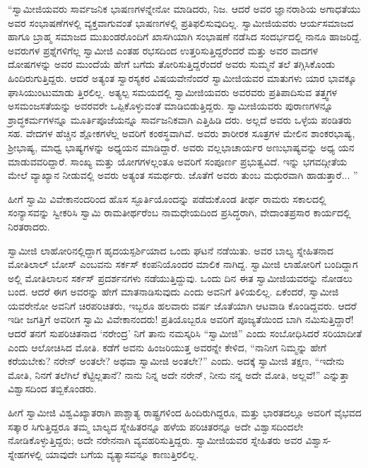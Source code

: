 “ಸ್ವಾಮೀಜಿಯವರು ಸಾರ್ವಜನಿಕ ಭಾಷಣಗಳನ್ನೇನೋ ಮಾಡಿದರು, ನಿಜ. ಆದರೆ ಅವರ ಜ್ಞಾನರಾಶಿಯ ಅಗಾಧತೆಯು ಅವರ ಸಂಭಾಷಣೆಗಳಲ್ಲಿ ವ್ಯಕ್ತವಾಗುವಂತೆ ಭಾಷಣಗಳಲ್ಲಿ ಪ್ರತಿಫಲಿಸುವುದಿಲ್ಲ. ಸ್ವಾಮೀಜಿಯವರು ಆರ್ಯಸಮಾಜದ ಹಾಗೂ ಬ್ರಾಹ್ಮ ಸಮಾಜದ ಮುಖಂಡರೊಂದಿಗೆ ಖಾಸಗಿಯಾಗಿ ಸಂಭಾಷಣೆ ನಡೆಸಿದ ಸಂದರ್ಭದಲ್ಲಿ ನಾನೂ ಹಾಜರಿದ್ದೆ. ಅವರುಗಳ ಪ್ರಶ್ನೆಗಳಿಗೆಲ್ಲ ಸ್ವಾಮೀಜಿ ಎಂತಹ ರಭಸದಿಂದ ಉತ್ತರಿಸುತ್ತಿದ್ದರೆಂದರೆ ಮತ್ತು ಅವರ ವಾದಗಳ ದೋಷಗಳನ್ನು ಅವರ ಮುಂದೆಯೆ ಹೇಗೆ ಬಗೆದು ತೋರಿಸುತ್ತಿದ್ದರೆಂದರೆ ಅವರು ಸುಮ್ಮನೆ ತಲೆ ತಗ್ಗಿಸಿಕೊಂಡು ಹಿಂದಿರುಗುತ್ತಿದ್ದರು. ಆದರೆ ಅತ್ಯಂತ ಸ್ವಾರಸ್ಯಕರ ವಿಷಯವೇನೆಂದರೆ ಸ್ವಾಮೀಜಿಯವರ ಮಾತುಗಳು ಯಾರ ಭಾವಕ್ಕೂ ಘಾಸಿಯುಂಟುಮಾಡು ತ್ತಿರಲಿಲ್ಲ. ಅತ್ಯಲ್ಪ ಸಮಯದಲ್ಲಿ ಸ್ವಾಮೀಜಿಯವರು ಅವರವರು ಪ್ರತಿಪಾದಿಸುವ ತತ್ತ್ವಗಳ ಅಸಮಂಜಸತೆಯನ್ನು ಅವರವರೇ ಒಪ್ಪಿಕೊಳ್ಳುವಂತೆ ಮಾಡಿಬಿಡುತ್ತಿದ್ದರು. ಸ್ವಾಮೀಜಿಯವರು ಪುರಾಣಗಳನ್ನೂ ಶ್ರಾದ್ಧಕರ್ಮಗಳನ್ನೂ ಮೂರ್ತಿಪೂಜೆಯನ್ನೂ ಸಾರ್ವಜನಿಕವಾಗಿ ಎತ್ತಿಹಿಡಿ ದರು. ಅಲ್ಲದೆ ಅವರು ಒಳ್ಳೆಯ ಪಂಡಿತರು ಸಹ. ವೇದಗಳ ಹೆಚ್ಚಿನ ಶ್ಲೋಕಗಳೆಲ್ಲ ಅವರಿಗೆ ಕಂಠಸ್ಥವಾಗಿವೆ. ಅವರು ಶಾರೀರಕ ಸೂತ್ರಗಳ ಮೇಲಿನ ಶಾಂಕರಭಾಷ್ಯ, ಶ್ರೀಭಾಷ್ಯ, ಮಾಧ್ವ ಭಾಷ್ಯಗಳನ್ನು ಅಧ್ಯಯನ ಮಾಡಿದ್ದಾರೆ. ಅವರು ವಲ್ಲಭಾಚಾರ್ಯರ ಅಣುಭಾಷ್ಯವನ್ನು ಅಧ್ಯ ಯನ ಮಾಡುವವರಿದ್ದಾರೆ. ಸಾಂಖ್ಯ ಮತ್ತು ಯೋಗಗಳಲ್ಲಂತೂ ಅವರಿಗೆ ಸಂಪೂರ್ಣ ಪ್ರಭುತ್ವವಿದೆ. ಇನ್ನು ಭಗವದ್ಗೀತೆಯ ಮೇಲೆ ವ್ಯಾಖ್ಯಾನ ನೀಡುವಲ್ಲಿ ಅವರು ಅತ್ಯಂತ ಸಮರ್ಥರು. ಜೊತೆಗೆ ಅವರು ತುಂಬ ಮಧುರವಾಗಿ ಹಾಡುತ್ತಾರೆ... ”

ಹೀಗೆ ಸ್ವಾಮಿ ವಿವೇಕಾನಂದರಿಂದ ಹೊಸ ಸ್ಫೂರ್ತಿಯೊಂದನ್ನು ಪಡೆದುಕೊಂಡ ತೀರ್ಥ ರಾಮರು ಸಕಾಲದಲ್ಲಿ ಸಂನ್ಯಾಸವನ್ನು ಸ್ವೀಕರಿಸಿ ಸ್ವಾಮಿ ರಾಮತೀರ್ಥರೆಂಬ ನಾಮಧೇಯದಿಂದ ಪ್ರಸಿದ್ಧರಾಗಿ, ವೇದಾಂತಪ್ರಸಾರ ಕಾರ್ಯದಲ್ಲಿ ನಿರತರಾದರು.

ಸ್ವಾಮೀಜಿ ಲಾಹೋರಿನಲ್ಲಿದ್ದಾಗ ಹೃದಯಸ್ಪರ್ಶಿಯಾದ ಒಂದು ಘಟನೆ ನಡೆಯಿತು. ಅವರ ಬಾಲ್ಯ ಸ್ನೇಹಿತನಾದ ಮೋತಿಲಾಲ್ ಬೋಸ್ ಎಂಬವನು ಸರ್ಕಸ್ ಕಂಪನಿಯೊಂದರ ಮಾಲಿಕ ನಾಗಿದ್ದ. ಸ್ವಾಮೀಜಿ ಲಾಹೋರಿಗೆ ಬಂದಿದ್ದಾಗ ಅಲ್ಲಿ ಮೋತಿಲಾಲನ ಸರ್ಕಸ್ ಪ್ರದರ್ಶನಗಳು ನಡೆಯುತ್ತಿದ್ದುವು. ಒಂದು ದಿನ ಈತ ಸ್ವಾಮೀಜಿಯವರನ್ನು ನೋಡಲು ಬಂದ. ಆದರೆ ಈಗ ಅವರನ್ನು ಹೇಗೆ ಮಾತನಾಡಿಸುವುದು ಎಂದು ಅವನಿಗೆ ತಿಳಿಯಲಿಲ್ಲ. ಏಕೆಂದರೆ, ಸ್ವಾಮೀಜಿ ಯವರೇನೋ ಅವನಿಗೆ ಚಿರಪರಿಚಿತರು, ಇಬ್ಬರೂ ಹಲವಾರು ವರ್ಷ ಜೊತೆಯಾಗಿ ಆಟವಾಡಿ ಕೊಂಡಿದ್ದವರು. ಆದರೆ ಇಡೀ ಜಗತ್ತಿಗೆ ಅವರೀಗ ಸ್ವಾಮಿ ವಿವೇಕಾನಂದರು! ಪ್ರತಿಯೊಬ್ಬರೂ ಅವರಿಗೆ ಪೂಜ್ಯತೆಯಿಂದ ಬಾಗಿ ನಮಿಸುತ್ತಿದ್ದಾರೆ! ಆದರೆ ತನಗೆ ಸುಪರಿಚಿತನಾದ ‘ನರೇಂದ್ರ’ ನಿಗೆ ತಾನು ನಮಸ್ಕರಿಸಿ “ಸ್ವಾಮೀಜಿ” ಎಂದು ಸಂಬೋಧಿಸಿದರೆ ಸರಿಯಾದೀತೆ ಎಂದು ಆಲೋಚಿಸಿದ ಮೋತಿ. ಕಡೆಗೆ ಅವನು ಹಿಂಜರಿಯುತ್ತ ಅವರನ್ನೇ ಕೇಳಿದ, “ನಾನೀಗ ನಿಮ್ಮನ್ನು ಹೇಗೆ ಕರೆಯಬೇಕು? ನರೇನ್ ಅಂತಲೇ? ಅಥವಾ ಸ್ವಾಮೀಜಿ ಅಂತಲೇ?” ಎಂದು. ಅದಕ್ಕೆ ಸ್ವಾಮೀಜಿ ತಕ್ಷಣ, “ಇದೇನು ಮೋತಿ, ನಿನಗೆ ತಲೆಗಿಲೆ ಕೆಟ್ಟಿಲ್ಲತಾನೆ? ನಾನು ನಿನ್ನ ಅದೇ ನರೇನ್, ನೀನು ನನ್ನ ಅದೇ ಮೋತಿ, ಅಲ್ಲವೆ!” ಎನ್ನುತ್ತಾ ವಿಶ್ವಾಸದಿಂದ ತಬ್ಬಿಕೊಂಡರು.

ಹೀಗೆ ಸ್ವಾಮೀಜಿ ವಿಶ್ವವಿಖ್ಯಾತರಾಗಿ ಪಾಶ್ಚಾತ್ಯ ರಾಷ್ಟ್ರಗಳಿಂದ ಹಿಂದಿರುಗಿದ್ದರೂ, ಮತ್ತು ಭಾರತದಲ್ಲೂ ಅವರಿಗೆ ವೈಭವದ ಸತ್ಕಾರ ಸಿಗುತ್ತಿದ್ದರೂ ತಮ್ಮ ಬಾಲ್ಯದ ಸ್ನೇಹಿತರನ್ನೂ ಹಳೆಯ ಪರಿಚಿತರನ್ನೂ ಅದೇ ವಿಶ್ವಾಸದಿಂದಲೇ ನೋಡಿಕೊಳ್ಳುತ್ತಿದ್ದರು; ಅದೇ ನರೇನನಾಗಿ ವ್ಯವಹರಿಸುತ್ತಿದ್ದರು. ಸ್ವಾಮೀಜಿಯವರ ಸ್ನೇಹಿತರು ಅವರ ವಿಶ್ವಾಸ-ಸ್ನೇಹಗಳಲ್ಲಿ ಯಾವುದೇ ಬಗೆಯ ವ್ಯತ್ಯಾಸವನ್ನೂ ಕಾಣುತ್ತಿರಲಿಲ್ಲ.

